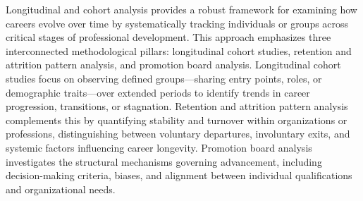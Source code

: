 \documentclass[./main.tex]{subfiles}
\begin{document}
Longitudinal and cohort analysis provides a robust framework for examining how careers evolve over time by systematically tracking individuals or groups across critical stages of professional development. This approach emphasizes three interconnected methodological pillars: longitudinal cohort studies, retention and attrition pattern analysis, and promotion board analysis. Longitudinal cohort studies focus on observing defined groups—sharing entry points, roles, or demographic traits—over extended periods to identify trends in career progression, transitions, or stagnation. Retention and attrition pattern analysis complements this by quantifying stability and turnover within organizations or professions, distinguishing between voluntary departures, involuntary exits, and systemic factors influencing career longevity. Promotion board analysis investigates the structural mechanisms governing advancement, including decision-making criteria, biases, and alignment between individual qualifications and organizational needs. 
\end{document}
